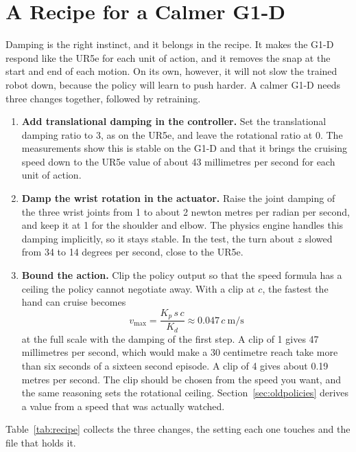 \section{A Recipe for a Calmer G1-D}
\label{sec:recipe}

Damping is the right instinct, and it belongs in the recipe. It makes the G1-D respond like the UR5e for each unit of action, and it removes the snap at the start and end of each motion. On its own, however, it will not slow the trained robot down, because the policy will learn to push harder. A calmer G1-D needs three changes together, followed by retraining.

\begin{enumerate}
\item \textbf{Add translational damping in the controller.} Set the translational damping ratio to 3, as on the UR5e, and leave the rotational ratio at 0. The measurements show this is stable on the G1-D and that it brings the cruising speed down to the UR5e value of about 43 millimetres per second for each unit of action.
\item \textbf{Damp the wrist rotation in the actuator.} Raise the joint damping of the three wrist joints from 1 to about 2 newton metres per radian per second, and keep it at 1 for the shoulder and elbow. The physics engine handles this damping implicitly, so it stays stable. In the test, the turn about $z$ slowed from 34 to 14 degrees per second, close to the UR5e.
\item \textbf{Bound the action.} Clip the policy output so that the speed formula has a ceiling the policy cannot negotiate away. With a clip at $c$, the fastest the hand can cruise becomes
\begin{equation}
v_{\max} = \frac{K_p\, s\, c}{K_d} \approx 0.047\, c \ \text{m/s}
\end{equation}
at the full scale with the damping of the first step. A clip of 1 gives 47 millimetres per second, which would make a 30 centimetre reach take more than six seconds of a sixteen second episode. A clip of 4 gives about 0.19 metres per second. The clip should be chosen from the speed you want, and the same reasoning sets the rotational ceiling. Section~\ref{sec:oldpolicies} derives a value from a speed that was actually watched.
\end{enumerate}

Table~\ref{tab:recipe} collects the three changes, the setting each one touches and the file that holds it.

